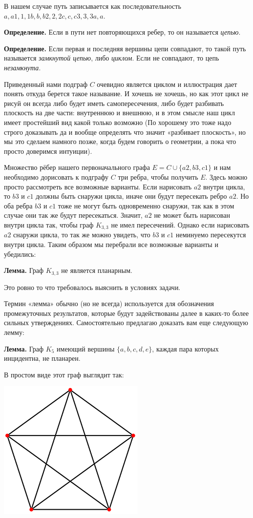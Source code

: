 В нашем случае путь записывается как последовательность $a, a1, 1, 1b, b, b2, 2, 2c, c, c3, 3, 3a, a$.

{\bfseries Определение.} Если в пути нет повторяющихся ребер, то он называется {\slshape цепью}.

{\bfseries Определение.} Если первая и последняя вершины цепи совпадают, то такой путь называется {\slshape замкнутой цепью}, либо {\slshape циклом}. Если не совпадают, то цепь {\slshape незамкнута}.

Приведенный нами подграф $C$ очевидно является циклом и иллюстрация дает понять откуда берется такое называние. И хочешь не хочешь, но как этот цикл не рисуй он всегда либо будет иметь самопересечения, либо будет разбивать плоскость на две части: внутреннюю и внешнюю, и в этом смысле наш цикл имеет простейший вид какой только возможно (По хорошему это тоже надо строго доказывать да и вообще определять что значит «разбивает плоскость», но мы это сделаем намного позже, когда будем говорить о геометрии, а пока что просто доверимся интуиции).

Множество рёбер нашего первоначального графа $E = C \cup \{a2, b3, c1\}$ и нам необходимо дорисовать к подграфу $C$ три ребра, чтобы получить $E$. Здесь можно просто рассмотреть все возможные варианты. Если нарисовать $a2$ внутри цикла, то $b3$ и $c 1$ должны быть снаружи цикла, иначе они будут пересекать ребро $a2$. Но оба ребра $b3$ и $c 1$ тоже не могут быть одновременно снаружи, так как в этом случае они так же будут пересекаться. Значит, $a2$ не может быть нарисован внутри цикла так, чтобы граф $K_{3, 3}$ не имел пересечений. Однако если нарисовать $a2$ снаружи цикла, то так же можно увидеть, что $b3$ и $c 1$ неминуемо пересекутся внутри цикла. Таким образом мы перебрали все возможные варианты и убедились:

{\bfseries Лемма.} Граф $K_{3, 3}$ не является планарным.

Это ровно то что требовалось выяснить в условиях задачи.

Термин «лемма» обычно (но не всегда) используется для обозначения промежуточных результатов, которые будут задействованы далее в каких-то более сильных утверждениях. Самостоятельно предлагаю доказать вам еще следующую лемму:

{\bfseries Лемма.} Граф $K_5$ имеющий вершины $\{a, b, c, d, e\}$, каждая пара которых инцидентна, не планарен.

В простом виде этот граф выглядит так:

\includegraphics{k5.png}

